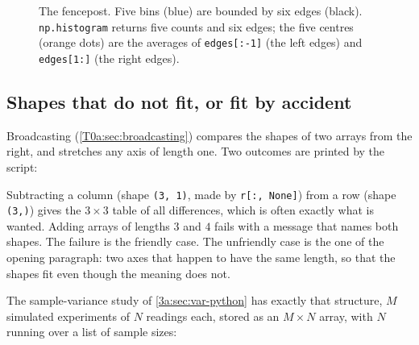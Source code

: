 \begin{figure}[htbp]
\centering
{}
\caption{The fencepost. Five bins (blue) are bounded by six edges (black). \texttt{np.histogram} returns five counts and six edges; the five centres (orange dots) are the averages of \texttt{edges[:-1]} (the left edges) and \texttt{edges[1:]} (the right edges).}
\label{T0a:fig:fencepost}
\end{figure}

\subsection{Shapes that do not fit, or fit by accident}
\label{T0a:sec:pit-shape}

Broadcasting (\cref{T0a:sec:broadcasting}) compares the shapes of two arrays from the right, and stretches any axis of length one. Two outcomes are printed by the script:


Subtracting a column (shape \texttt{(3, 1)}, made by \texttt{r[:, None]}) from a row (shape \texttt{(3,)}) gives the $3\times3$ table of all differences, which is often exactly what is wanted. Adding arrays of lengths $3$ and $4$ fails with a message that names both shapes. The failure is the friendly case. The unfriendly case is the one of the opening paragraph: two axes that happen to have the same length, so that the shapes fit even though the meaning does not.

The sample-variance study of \cref{3a:sec:var-python} has exactly that structure, $M$ simulated experiments of $N$ readings each, stored as an $M\times N$ array, with $N$ running over a list of sample sizes:


